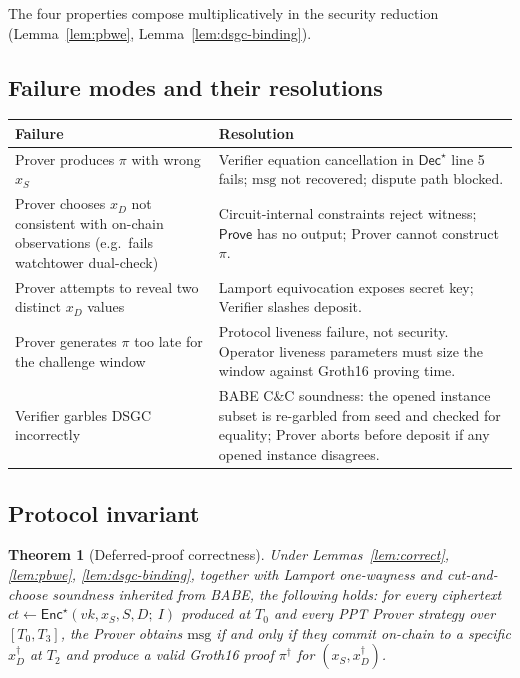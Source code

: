 \documentclass[11pt]{article}
\newtheorem{theorem}{Theorem}
\newcommand{\msg}{\mathrm{msg}}
\newcommand{\Enc}{\mathsf{Enc}}
\newcommand{\Dec}{\mathsf{Dec}}
\begin{document}
The four properties compose multiplicatively in the security
reduction (Lemma~\ref{lem:pbwe}, Lemma~\ref{lem:dsgc-binding}).

\subsection{Failure modes and their resolutions}

\begin{center}\small
\renewcommand{\arraystretch}{1.25}
\begin{tabular}{@{}p{5.5cm} p{6.5cm}@{}}
\toprule
\textbf{Failure} & \textbf{Resolution} \\
\midrule
Prover produces $\pi$ with wrong $x_S$ & Verifier equation
cancellation in $\Dec^\star$ line 5 fails; $\msg$ not recovered;
dispute path blocked. \\
Prover chooses $x_D$ not consistent with on-chain observations
(e.g.\ fails watchtower dual-check) & Circuit-internal constraints
reject witness; $\mathsf{Prove}$ has no output; Prover cannot
construct $\pi$. \\
Prover attempts to reveal two distinct $x_D$ values & Lamport
equivocation exposes secret key; Verifier slashes deposit. \\
Prover generates $\pi$ too late for the challenge window & Protocol
liveness failure, not security. Operator liveness parameters must
size the window against Groth16 proving time. \\
Verifier garbles DSGC incorrectly & BABE C\&C soundness: the opened
instance subset is re-garbled from seed and checked for equality;
Prover aborts before deposit if any opened instance disagrees. \\
\bottomrule
\end{tabular}
\end{center}

\subsection{Protocol invariant}

\begin{theorem}[Deferred-proof correctness]\label{thm:deferred}
Under Lemmas~\ref{lem:correct}, \ref{lem:pbwe},
\ref{lem:dsgc-binding}, together with Lamport one-wayness and
cut-and-choose soundness inherited from BABE, the following holds:
for every ciphertext $ct \gets \Enc^\star(vk, x_S, S, D;\ I)$
produced at $T_0$ and every PPT Prover strategy over $[T_0, T_3]$,
the Prover obtains $\msg$ if and only if they commit on-chain to a
specific $x_D^\dagger$ at $T_2$ and produce a valid Groth16 proof
$\pi^\dagger$ for $(x_S, x_D^\dagger)$.
\end{theorem}
\end{document}
